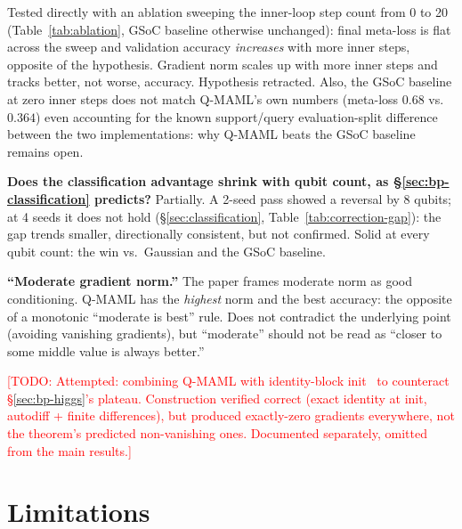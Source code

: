 \documentclass[11pt]{article}
\newcommand{\todo}[1]{\textcolor{red}{[TODO: #1]}}
\begin{document}
Tested directly with an ablation sweeping the inner-loop step count from 0 to 20 (Table~\ref{tab:ablation},
GSoC baseline otherwise unchanged): final meta-loss is flat across the sweep and validation accuracy
\emph{increases} with more inner steps, opposite of the hypothesis. Gradient norm scales up with more inner
steps and tracks better, not worse, accuracy. Hypothesis retracted. Also, the GSoC baseline at zero inner
steps does not match Q-MAML's own numbers (meta-loss $0.68$ vs.\ $0.364$) even accounting for the known
support/query evaluation-split difference between the two implementations: why Q-MAML beats the GSoC
baseline remains open.

\textbf{Does the classification advantage shrink with qubit count, as \S\ref{sec:bp-classification}
predicts?} Partially. A 2-seed pass showed a reversal by 8 qubits; at 4 seeds it does not hold
(\S\ref{sec:classification}, Table~\ref{tab:correction-gap}): the gap trends smaller, directionally
consistent, but not confirmed. Solid at every qubit count: the win vs.\ Gaussian and the GSoC baseline.

\textbf{``Moderate gradient norm.''} The paper frames moderate norm as good conditioning. Q-MAML has the
\emph{highest} norm and the best accuracy: the opposite of a monotonic ``moderate is best'' rule. Does not
contradict the underlying point (avoiding vanishing gradients), but ``moderate'' should not be read as
``closer to some middle value is always better.''

\todo{Attempted: combining Q-MAML with identity-block init~\citep{grant2019initialization} to counteract
\S\ref{sec:bp-higgs}'s plateau. Construction verified correct (exact identity at init, autodiff + finite
differences), but produced exactly-zero gradients everywhere, not the theorem's predicted non-vanishing
ones. Documented separately, omitted from the main results.}

\section{Limitations}
\label{sec:limitations}
\end{document}
